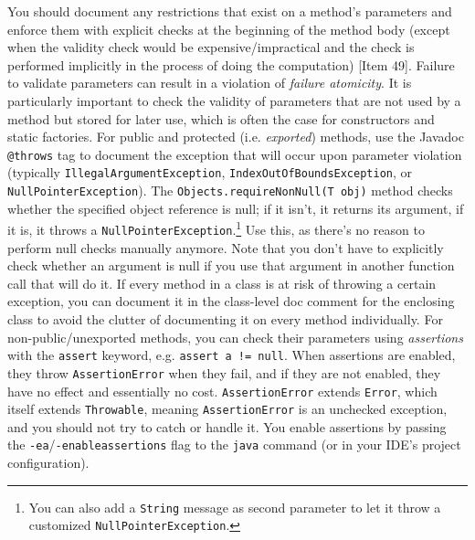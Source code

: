 \documentclass[8pt, table, xcdraw]{article}%
\begin{document}
You should document any restrictions that exist on a method's parameters and enforce them with explicit checks at the beginning of the method body (except when the validity check would be expensive/impractical and the check is performed implicitly in the process of doing the computation) [Item 49]. Failure to validate parameters can result in a violation of \emph{failure atomicity}. It is particularly important to check the validity of parameters that are not used by a method but stored for later use, which is often the case for constructors and static factories. For public and protected (i.e. \emph{exported}) methods, use the Javadoc \lstinline{@throws} tag to document the exception that will occur upon parameter violation (typically \lstinline{IllegalArgumentException}, \lstinline{IndexOutOfBoundsException}, or \lstinline{NullPointerException}). The \lstinline{Objects.requireNonNull(T obj)} method checks whether the specified object reference is null; if it isn't, it returns its argument, if it is, it throws a \lstinline{NullPointerException}.\footnote{You can also add a \lstinline{String} message as second parameter to let it throw a customized \lstinline{NullPointerException}.} Use this, as there’s no reason to perform null checks manually anymore. Note that you don't have to explicitly check whether an argument is null if you use that argument in another function call that will do it. If every method in a class is at risk of throwing a certain exception, you can document it in the class-level doc comment for the enclosing class to avoid the clutter of documenting it on every method individually. For non-public/unexported methods, you can check their parameters using \emph{assertions} with the \lstinline{assert} keyword, e.g. \lstinline{assert a != null}. When assertions are enabled, they throw \lstinline{AssertionError} when they fail, and if they are not enabled, they have no effect and essentially no cost. \lstinline{AssertionError} extends \lstinline{Error}, which itself extends \lstinline{Throwable}, meaning \lstinline{AssertionError} is an unchecked exception, and you should not try to catch or handle it. You enable assertions by passing the \lstinline{-ea}/\lstinline{-enableassertions} flag to the \lstinline{java} command (or in your IDE's project configuration).
\end{document}
